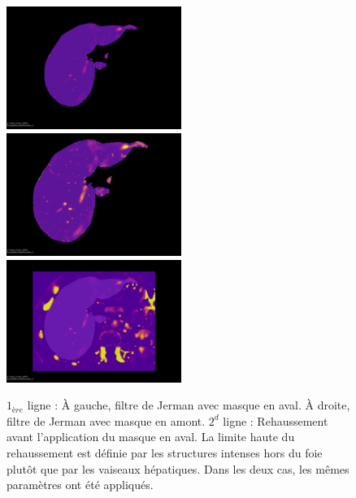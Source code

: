 \begin{figure}[h]
  \centering
  \includegraphics[height=4cm]{Images/globInfo_noM_loc.png}
  \includegraphics[height=4cm]{Images/globInfo_M_loc.png}
  \includegraphics[height=4cm]{Images/globInfo_noM_glob.png}
  \label{fig:smart_mask_effect}
  \caption{$1_{ère}$ ligne : À gauche, filtre de Jerman avec masque en aval. À droite, filtre de Jerman avec masque en amont. $2^d$ ligne : Rehaussement avant l'application du masque en aval. La limite haute du rehaussement est définie par les structures intenses hors du foie plutôt que par les vaiseaux hépatiques. Dans les deux cas, les mêmes paramètres ont été appliqués.}
\end{figure}

